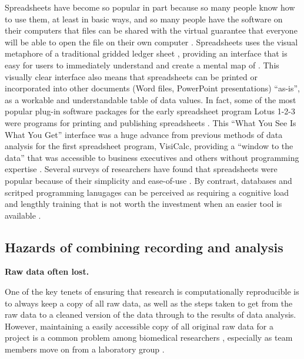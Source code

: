 \documentclass[]{tufte-book}
\begin{document}
Spreadsheets have become so popular in part because so many people know how to
use them, at least in basic ways, and so many people have the software on their
computers that files can be shared with the virtual guarantee that everyone will
be able to open the file on their own computer \citep{hermans2016spreadsheets}.
Spreadsheets uses the visual metaphore of a traditional gridded ledger sheet
\citep{levy1984spreadsheet}, providing an interface that is easy for users to
immediately understand and create a mental map of \citep{birch2018future, barga2011bioinformatics}. This visually clear interface also means that
spreadsheets can be printed or incorporated into other documents (Word files,
PowerPoint presentations) ``as-is'', as a workable and understandable table of
data values. In fact, some of the most popular plug-in software packages for the
early spreadsheet program Lotus 1-2-3 were programs for printing and publishing
spreadsheets \citep{campbell2007number}. This ``What You See Is What You Get''
interface was a huge advance from previous methods of data analysis for the
first spreadsheet program, VisiCalc, providing a ``window to the data'' that was
accessible to business executives and others without programming expertise
\citep{creeth1985microcomputer}. Several surveys of researchers have found that
spreadsheets were popular because of their simplicity and ease-of-use
\citep{anderson2007issues, altarawneh2017pilot, barga2011bioinformatics}. By
contrast, databases and scritped programming lanugages can be perceived as
requiring a cognitive load and lengthly training that is not worth the
investment when an easier tool is available \citep{hermans2016spreadsheets, anderson2007issues, myneni2010organization, barga2011bioinformatics, topaloglou2004biological}.

\hypertarget{hazards-of-combining-recording-and-analysis}{%
\subsection{Hazards of combining recording and analysis}\label{hazards-of-combining-recording-and-analysis}}

\textbf{Raw data often lost.}

One of the key tenets of ensuring that research is computationally reproducible
is to always keep a copy of all raw data, as well as the steps taken to get from
the raw data to a cleaned version of the data through to the results of data
analysis. However, maintaining a easily accessible copy of all original raw data
for a project is a common problem among biomedical researchers
\citep{goodman2014ten}, especially as team members move on from a laboratory group
\citep{myneni2010organization}.
\end{document}
